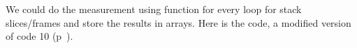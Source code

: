 We could do the measurement using  function for every loop for stack slices/frames and store the results in arrays. Here is the code, a modified version of code 10 (p~\pageref{code:10}).